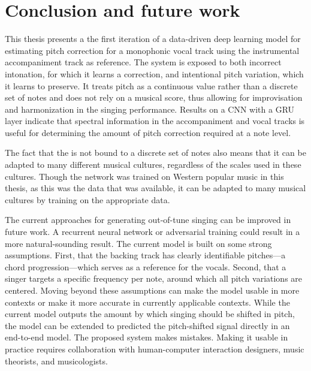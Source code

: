 \chapter{Conclusion and future work}
\label{chap:conclusion}

This thesis presents a the first iteration of a data-driven deep learning model for estimating pitch correction for a monophonic vocal track using the instrumental accompaniment track as reference. The system is exposed to both incorrect intonation, for which it learns a correction, and intentional pitch variation, which it learns to preserve. It treats pitch as a continuous value rather than a discrete set of notes and does not rely on a musical score, thus allowing for improvisation and harmonization in the singing performance. Results on a CNN with a GRU layer indicate that spectral information in the accompaniment and vocal tracks is useful for determining the amount of pitch correction required at a note level. 

The fact that the is not bound to a discrete set of notes also means that it can be adapted to many different musical cultures, regardless of the scales used in these cultures. Though the network was trained on Western popular music in this thesis, as this was the data that was available, it can be adapted to many musical cultures by training on the appropriate data.

The current approaches for generating out-of-tune singing can be improved in future work. A recurrent neural network or adversarial training could result in a more natural-sounding result. The current model is built on some strong assumptions. First, that the backing track has clearly identifiable pitches---a chord progression---which serves as a reference for the vocals. Second, that a singer targets a specific frequency per note, around which all pitch variations are centered. Moving beyond these assumptions can make the model usable in more contexts or make it more accurate in currently applicable contexts. While the current model outputs the amount by which singing should be shifted in pitch, the model can be extended to predicted the pitch-shifted signal directly in an end-to-end model. The proposed system makes mistakes. Making it usable in practice requires collaboration with human-computer interaction designers, music theorists, and musicologists.